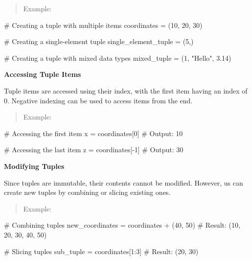 \documentclass[
  letterpaper,
  DIV=11,
  numbers=noendperiod]{scrreprt}
\newenvironment{Shaded}{\begin{snugshade}}{\end{snugshade}}
\newcommand{\CommentTok}[1]{\textcolor[rgb]{0.37,0.37,0.37}{#1}}
\newcommand{\DecValTok}[1]{\textcolor[rgb]{0.68,0.00,0.00}{#1}}
\newcommand{\FloatTok}[1]{\textcolor[rgb]{0.68,0.00,0.00}{#1}}
\newcommand{\NormalTok}[1]{\textcolor[rgb]{0.00,0.23,0.31}{#1}}
\newcommand{\OperatorTok}[1]{\textcolor[rgb]{0.37,0.37,0.37}{#1}}
\newcommand{\StringTok}[1]{\textcolor[rgb]{0.13,0.47,0.30}{#1}}
\theoremstyle{plain}
\theoremstyle{definition}
\theoremstyle{remark}
\begin{document}
\begin{quote}
Example:
\end{quote}

\begin{Shaded}
\begin{Highlighting}[]
\CommentTok{\# Creating a tuple with multiple items}
\NormalTok{coordinates }\OperatorTok{=}\NormalTok{ (}\DecValTok{10}\NormalTok{, }\DecValTok{20}\NormalTok{, }\DecValTok{30}\NormalTok{)}

\CommentTok{\# Creating a single{-}element tuple}
\NormalTok{single\_element\_tuple }\OperatorTok{=}\NormalTok{ (}\DecValTok{5}\NormalTok{,)}

\CommentTok{\# Creating a tuple with mixed data types}
\NormalTok{mixed\_tuple }\OperatorTok{=}\NormalTok{ (}\DecValTok{1}\NormalTok{, }\StringTok{"Hello"}\NormalTok{, }\FloatTok{3.14}\NormalTok{)}
\end{Highlighting}
\end{Shaded}

\textbf{Accessing Tuple Items}

Tuple items are accessed using their index, with the first item having
an index of 0. Negative indexing can be used to access items from the
end.

\begin{quote}
Example:
\end{quote}

\begin{Shaded}
\begin{Highlighting}[]
\CommentTok{\# Accessing the first item}
\NormalTok{x }\OperatorTok{=}\NormalTok{ coordinates[}\DecValTok{0}\NormalTok{]  }\CommentTok{\# Output: 10}

\CommentTok{\# Accessing the last item}
\NormalTok{z }\OperatorTok{=}\NormalTok{ coordinates[}\OperatorTok{{-}}\DecValTok{1}\NormalTok{]  }\CommentTok{\# Output: 30}
\end{Highlighting}
\end{Shaded}

\textbf{Modifying Tuples}

Since tuples are immutable, their contents cannot be modified. However,
us can create new tuples by combining or slicing existing ones.

\begin{quote}
Example:
\end{quote}

\begin{Shaded}
\begin{Highlighting}[]
\CommentTok{\# Combining tuples}
\NormalTok{new\_coordinates }\OperatorTok{=}\NormalTok{ coordinates }\OperatorTok{+}\NormalTok{ (}\DecValTok{40}\NormalTok{, }\DecValTok{50}\NormalTok{)  }\CommentTok{\# Result: (10, 20, 30, 40, 50)}

\CommentTok{\# Slicing tuples}
\NormalTok{sub\_tuple }\OperatorTok{=}\NormalTok{ coordinates[}\DecValTok{1}\NormalTok{:}\DecValTok{3}\NormalTok{]  }\CommentTok{\# Result: (20, 30)}
\end{Highlighting}
\end{Shaded}
\end{document}
